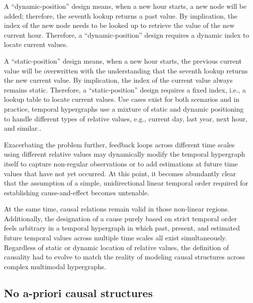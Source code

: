 A “dynamic-position” design means, when a new hour starts, a new node will be added; therefore, the seventh lookup returns a past value. By implication, the index of the new node needs to be looked up to retrieve the value of the new current hour. Therefore, a “dynamic-position” design requires a dynamic index to locate current values.

A “static-position” design means, when a new hour starts, the previous current value will be overwritten with the understanding that the seventh lookup returns the new current value. By implication, the index of the current value always remains static. Therefore, a “static-position” design requires a fixed index, i.e., a lookup table to locate current values. Use cases exist for both scenarios and in practice, temporal hypergraphs use a mixture of static and dynamic positioning to handle different types of relative values, e.g., current day, last year, next hour, and similar..

Exacerbating the problem further, feedback loops across different time scales using different relative values may dynamically modify the temporal hypergraph itself to capture non-regular observations or to add estimations at future time values that have not yet occurred.   
At this point, it becomes abundantly clear that the assumption of a simple, unidirectional linear temporal order required for establishing cause-and-effect becomes untenable.

At the same time, causal relations remain valid in those non-linear regions. Additionally, the designation of a cause purely based on strict temporal order feels arbitrary in a temporal hypergraph in which past, present, and estimated future temporal values across multiple time scales all exist simultaneously. Regardless of static or dynamic location of relative values, the definition of causality had to evolve to match the reality of modeling causal structures across complex multimodal hypergraphs.


\subsection{No a-priori causal structures}

